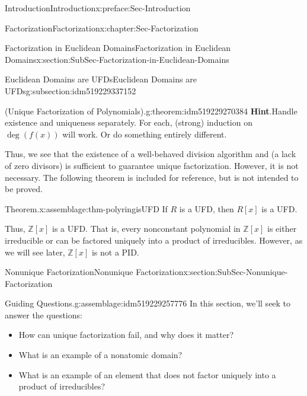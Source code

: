 \documentclass[oneside,10pt,]{book}
\newcommand{\blocktitlefont}{\relax}
\numberwithin{equation}{section}
\def\Z{{\mathbb Z}}
\begin{document}
\begin{preface}{Introduction}{}{Introduction}{}{}{x:preface:Sec-Introduction}
\begin{chapterptx}{Factorization}{}{Factorization}{}{}{x:chapter:Sec-Factorization}
\begin{sectionptx}{Factorization in Euclidean Domains}{}{Factorization in Euclidean Domains}{}{}{x:section:SubSec-Factorization-in-Euclidean-Domains}
\begin{subsectionptx}{Euclidean Domains are UFDs}{}{Euclidean Domains are UFDs}{}{}{g:subsection:idm519229337152}
\begin{theorem}{(Unique Factorization of Polynomials).}{}{g:theorem:idm519229270384}
\textbf{\blocktitlefont Hint}.\quad{}Handle existence and uniqueness separately. For each, (strong) induction on \(\deg(f(x))\) will work. Or do something entirely different.%
\end{theorem}
Thus, we see that the existence of a well-behaved division algorithm and (a lack of zero divisors) is sufficient to guarantee unique factorization. However, it is not necessary. The following theorem is included for reference, but is not intended to be proved.%
\begin{assemblage}{Theorem.}{x:assemblage:thm-polyringisUFD}%
If \(R\) is a UFD, then \(R[x]\) is a UFD.%
\end{assemblage}
Thus, \(\Z[x]\) is a UFD. That is, every nonconstant polynomial in \(\Z[x]\) is either irreducible or can be factored uniquely into a product of irreducibles.  However, as we will see later, \(\Z[x]\) is not a PID.%
\end{subsectionptx}
\end{sectionptx}
%
%
\typeout{************************************************}
\typeout{************************************************}
%
\begin{sectionptx}{Nonunique Factorization}{}{Nonunique Factorization}{}{}{x:section:SubSec-Nonunique-Factorization}
\begin{assemblage}{Guiding Questions.}{g:assemblage:idm519229257776}%
In this section, we'll seek to answer the questions: %
\begin{itemize}[label=\textbullet]
\item{}How can unique factorization fail, and why does it matter?%
\item{}What is an example of a nonatomic domain?%
\item{}What is an example of an element that does not factor uniquely into a product of irreducibles?%
\end{itemize}
%
\end{assemblage}

\end{sectionptx}
\end{chapterptx}
\end{preface}
\end{document}
